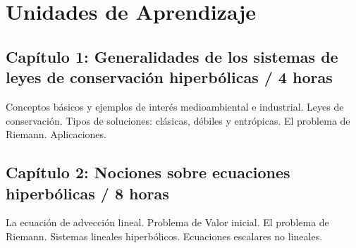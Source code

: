



\section{Unidades de Aprendizaje}

\subsection*{Capítulo 1: Generalidades de los sistemas de leyes de conservación hiperbólicas / 4 horas}

Conceptos básicos y ejemplos de interés medioambiental e industrial.
Leyes de conservación.
Tipos de soluciones: clásicas, débiles y entrópicas.
El problema de Riemann.
Aplicaciones.

\subsection*{Capítulo 2: Nociones sobre ecuaciones hiperbólicas / 8 horas}

La ecuación de advección lineal.
Problema de Valor inicial.
El problema de Riemann.
Sistemas lineales hiperbólicos.
Ecuaciones escalares no lineales.

